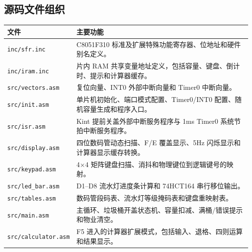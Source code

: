 \documentclass[12pt,a4paper]{article}
\begin{document}
\subsection{源码文件组织}
\begin{table}[H]
    \centering
    \small
    \begin{tabular}{|p{4.2cm}|p{10.8cm}|}
        \hline
        文件 & 主要功能 \\
        \hline
        \texttt{inc/sfr.inc} & C8051F310 标准及扩展特殊功能寄存器、位地址和硬件别名定义。 \\
        \hline
        \texttt{inc/iram.inc} & 片内 RAM 共享变量地址定义，包括容量、键盘、倒计时、提示和计算器缓存。 \\
        \hline
        \texttt{src/vectors.asm} & 复位向量、INT0 外部中断向量和 Timer0 中断向量。 \\
        \hline
        \texttt{src/init.asm} & 单片机初始化、端口模式配置、Timer0/INT0 配置、随机容量生成和程序入口。 \\
        \hline
        \texttt{src/isr.asm} & Kint 提前关盖外部中断服务程序与 1ms Timer0 系统节拍中断服务程序。 \\
        \hline
        \texttt{src/display.asm} & 四位数码管动态扫描、F/E 覆盖显示、5Hz 闪烁显示和计算器显示缓存转换。 \\
        \hline
        \texttt{src/keypad.asm} & 4$\times$4 矩阵键盘扫描、消抖和物理键位到逻辑键号的映射。 \\
        \hline
        \texttt{src/led\_bar.asm} & D1--D8 流水灯进度条计算和 74HCT164 串行移位输出。 \\
        \hline
        \texttt{src/tables.asm} & 数码管段码表、流水灯等级掩码表和键盘重映射表。 \\
        \hline
        \texttt{src/main.asm} & 主循环、垃圾桶开盖状态机、容量扣减、满桶/错误提示和物业清空。 \\
        \hline
        \texttt{src/calculator.asm} & F5 进入的计算器扩展模式，包括输入、退格、四则运算和结果显示。 \\
        \hline
    \end{tabular}
\end{table}

\end{document}
